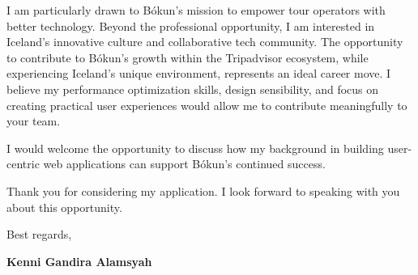 \documentclass[11pt]{article}
\begin{document}
I am particularly drawn to Bókun's mission to empower tour operators with better technology. Beyond the professional opportunity, I am interested in Iceland's innovative culture and collaborative tech community. The opportunity to contribute to Bókun's growth within the Tripadvisor ecosystem, while experiencing Iceland's unique environment, represents an ideal career move. I believe my performance optimization skills, design sensibility, and focus on creating practical user experiences would allow me to contribute meaningfully to your team.

I would welcome the opportunity to discuss how my background in building user-centric web applications can support Bókun's continued success.

Thank you for considering my application. I look forward to speaking with you about this opportunity.

\vspace{1em}

Best regards,

\textbf{Kenni Gandira Alamsyah}
\end{document}
